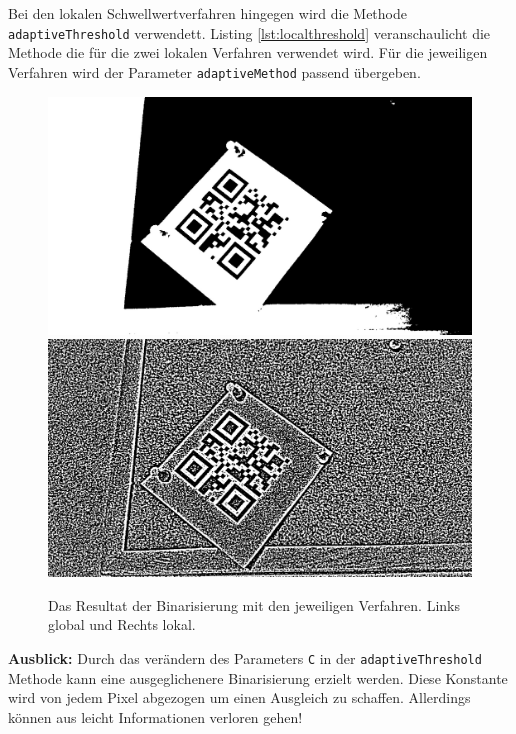 Bei den lokalen Schwellwertverfahren hingegen wird die Methode \texttt{adaptiveThreshold} verwendett. Listing \ref{lst:localthreshold} veranschaulicht die Methode die für die zwei lokalen Verfahren verwendet wird. Für die jeweiligen Verfahren wird der Parameter \texttt{adaptiveMethod} passend übergeben.
\begin{figure}[h]
\center
\includegraphics[scale=0.12]{images/qrcode-adler-wand_1___BINARIZED___.jpg}
\hspace{5px}
\includegraphics[scale=0.12]{images/qrcode-adler-wand_2___BINARIZED___.jpg}
\caption{Das Resultat der Binarisierung mit den jeweiligen Verfahren. Links global und Rechts lokal.}
\end{figure}

\textbf{Ausblick:} Durch das verändern des Parameters \texttt{C} in der \texttt{adaptiveThreshold} Methode kann eine ausgeglichenere Binarisierung erzielt werden. Diese Konstante wird von jedem Pixel abgezogen um einen Ausgleich zu schaffen. Allerdings können aus leicht Informationen verloren gehen!

